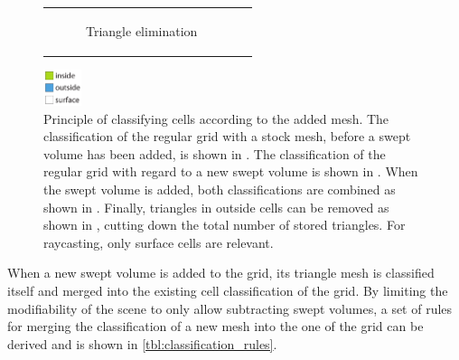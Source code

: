 \begin{figure}[!h]
\begin{tabular}{cc}
\begin{subfigure}[t]{0.3\textwidth}
			\caption{Triangle elimination}
			\label{fig:classification_after_removal}
		\end{subfigure}\\
	\end{tabular}
	\includegraphics[width=0.1\textwidth]{images/classification_legend}
	\caption[Cell classification]{
		Principle of classifying cells according to the added mesh.
		The classification of the regular grid with a stock mesh, before a swept volume has been added, is shown in .
		The classification of the regular grid with regard to a new swept volume is shown in .
		When the swept volume is added, both classifications are combined as shown in .
		Finally, triangles in outside cells can be removed as shown in , cutting down the total number of stored triangles.
		For raycasting, only surface cells are relevant.
	}
	\label{fig:classification}
\end{figure}

When a new swept volume is added to the grid, its triangle mesh is classified itself and merged into the existing cell classification of the grid.
By limiting the modifiability of the scene to only allow subtracting swept volumes, a set of rules for merging the classification of a new mesh into the one of the grid can be derived and is shown in \cref{tbl:classification_rules}.

